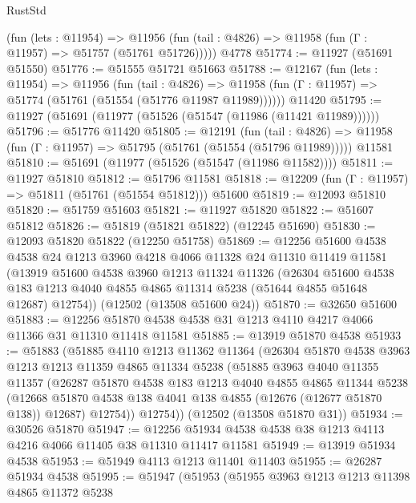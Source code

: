 \begin{lexlean}{RustStd}
\begin{coremodule}
      (fun (lets : @11954) =>
      @11956 (fun (tail : @4826) => @11958 (fun (Γ : @11957) => @51757 (@51761 @51726)))))
    @4778
@51774 := @11927 (@51691 @51550)
@51776 := @51555 @51721 @51663
@51788 := @12167
    (fun (lets : @11954) =>
    @11956
      (fun (tail : @4826) =>
      @11958 (fun (Γ : @11957) => @51774 (@51761 (@51554 (@51776 @11987 @11989))))))
    @11420
@51795 := @11927 (@51691 (@11977 (@51526 (@51547 (@11986 (@11421 @11989))))))
@51796 := @51776 @11420
@51805 := @12191
    (fun (tail : @4826) => @11958 (fun (Γ : @11957) => @51795 (@51761 (@51554 (@51796 @11989)))))
    @11581
@51810 := @51691 (@11977 (@51526 (@51547 (@11986 @11582))))
@51811 := @11927 @51810
@51812 := @51796 @11581
@51818 := @12209 (fun (Γ : @11957) => @51811 (@51761 (@51554 @51812))) @51600
@51819 := @12093 @51810
@51820 := @51759 @51603
@51821 := @11927 @51820
@51822 := @51607 @51812
@51826 := @51819 (@51821 @51822) (@12245 @51690)
@51830 := @12093 @51820 @51822 (@12250 @51758)
@51869 := @12256
    @51600
    @4538
    @4538
    @24
    @1213
    @3960
    @4218
    @4066
    @11328
    @24
    @11310
    @11419
    @11581
    (@13919
      @51600
      @4538
      @3960
      @1213
      @11324
      @11326
      (@26304
        @51600
        @4538
        @183
        @1213
        @4040
        @4855
        @4865
        @11314
        @5238
        (@51644 @4855 @51648 @12687)
        @12754))
    (@12502 (@13508 @51600 @24))
@51870 := @32650 @51600
@51883 := @12256 @51870 @4538 @4538 @31 @1213 @4110 @4217 @4066 @11366 @31 @11310 @11418 @11581
@51885 := @13919 @51870 @4538
@51933 := @51883
    (@51885
      @4110
      @1213
      @11362
      @11364
      (@26304
        @51870
        @4538
        @3963
        @1213
        @1213
        @11359
        @4865
        @11334
        @5238
        (@51885
          @3963
          @4040
          @11355
          @11357
          (@26287
            @51870
            @4538
            @183
            @1213
            @4040
            @4855
            @4865
            @11344
            @5238
            (@12668 @51870 @4538 @138 @4041 @138 @4855 (@12676 (@12677 @51870 @138)) @12687)
            @12754))
        @12754))
    (@12502 (@13508 @51870 @31))
@51934 := @30526 @51870
@51947 := @12256 @51934 @4538 @4538 @38 @1213 @4113 @4216 @4066 @11405 @38 @11310 @11417 @11581
@51949 := @13919 @51934 @4538
@51953 := @51949 @4113 @1213 @11401 @11403
@51955 := @26287 @51934 @4538
@51995 := @51947
    (@51953
      (@51955
        @3963
        @1213
        @1213
        @11398
        @4865
        @11372
        @5238

\end{coremodule}
\end{lexlean}
